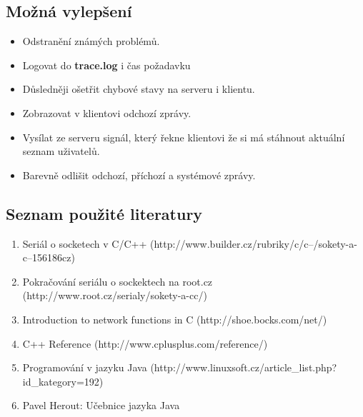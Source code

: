 \documentclass[11pt, titlepage]{article}
\begin{document}
\subsection{Možná vylepšení}
\begin{itemize}
 \item Odstranění známých problémů.
 \item Logovat do \textbf{trace.log} i čas požadavku
 \item Důsledněji ošetřit chybové stavy na serveru i klientu.
 \item Zobrazovat v klientovi odchozí zprávy.
 \item Vysílat ze serveru signál, který řekne klientovi že si má stáhnout aktuální seznam uživatelů.
 \item Barevně odlišit odchozí, příchozí a systémové zprávy.
\end{itemize}

\subsection{Seznam použité literatury}
\begin{enumerate}
 \item Seriál o socketech v C/C++ (\textsf{http://www.builder.cz/rubriky/c/c--/sokety-a-c--156186cz})
 \item Pokračování seriálu o sockektech na root.cz (\textsf{http://www.root.cz/serialy/sokety-a-cc/})
 \item Introduction to network functions in C (\textsf{http://shoe.bocks.com/net/})
 \item C++ Reference (\textsf{http://www.cplusplus.com/reference/})
 \item Programování v jazyku Java (\textsf{http://www.linuxsoft.cz/article\_list.php?id\_kategory=192})
 \item Pavel Herout: Učebnice jazyka Java
\end{enumerate}
\end{document}
